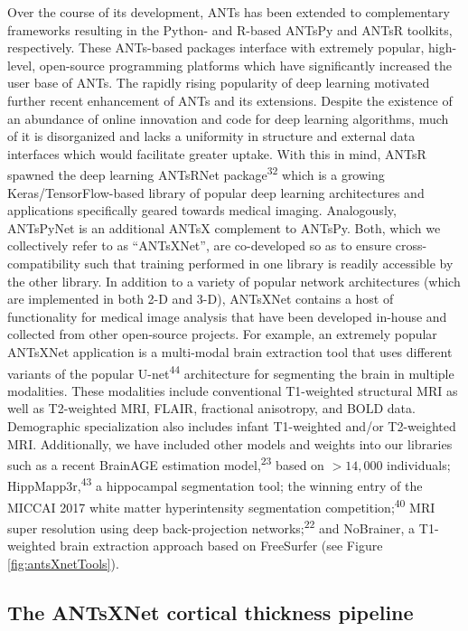 \documentclass[
  12pt,
]{article}
\begin{document}
Over the course of its development, ANTs has been extended to
complementary frameworks resulting in the Python- and R-based ANTsPy and
ANTsR toolkits, respectively. These ANTs-based packages interface with
extremely popular, high-level, open-source programming platforms which
have significantly increased the user base of ANTs. The rapidly rising
popularity of deep learning motivated further recent enhancement of ANTs
and its extensions. Despite the existence of an abundance of online
innovation and code for deep learning algorithms, much of it is
disorganized and lacks a uniformity in structure and external data
interfaces which would facilitate greater uptake. With this in mind,
ANTsR spawned the deep learning ANTsRNet package\textsuperscript{32}
which is a growing Keras/TensorFlow-based library of popular deep
learning architectures and applications specifically geared towards
medical imaging. Analogously, ANTsPyNet is an additional ANTsX
complement to ANTsPy. Both, which we collectively refer to as
``ANTsXNet'', are co-developed so as to ensure cross-compatibility such
that training performed in one library is readily accessible by the
other library. In addition to a variety of popular network architectures
(which are implemented in both 2-D and 3-D), ANTsXNet contains a host of
functionality for medical image analysis that have been developed
in-house and collected from other open-source projects. For example, an
extremely popular ANTsXNet application is a multi-modal brain extraction
tool that uses different variants of the popular
U-net\textsuperscript{44} architecture for segmenting the brain in
multiple modalities. These modalities include conventional T1-weighted
structural MRI as well as T2-weighted MRI, FLAIR, fractional anisotropy,
and BOLD data. Demographic specialization also includes infant
T1-weighted and/or T2-weighted MRI. Additionally, we have included other
models and weights into our libraries such as a recent BrainAGE
estimation model,\textsuperscript{23} based on \(>14,000\) individuals;
HippMapp3r,\textsuperscript{43} a hippocampal segmentation tool; the
winning entry of the MICCAI 2017 white matter hyperintensity
segmentation competition;\textsuperscript{40} MRI super resolution using
deep back-projection networks;\textsuperscript{22} and NoBrainer, a
T1-weighted brain extraction approach based on FreeSurfer (see Figure
\ref{fig:antsXnetTools}).

\hypertarget{the-antsxnet-cortical-thickness-pipeline}{%
\subsection*{The ANTsXNet cortical thickness
pipeline}\label{the-antsxnet-cortical-thickness-pipeline}}
\end{document}
